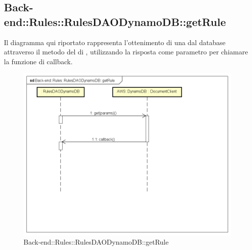 \subsection{Back-end::Rules::RulesDAODynamoDB::getRule}
Il diagramma qui riportato rappresenta l'ottenimento di una  dal database attraverso il metodo  del  di , utilizzando la risposta come parametro per chiamare la funzione di callback.
 \begin{figure}[h] \centering \includegraphics[width=\textwidth,height=\textheight,keepaspectratio]{images/diagrams/back-end/Ufficial_Backend/Back-endRulesRulesDAODynamoDBgetRule.png} 	\caption{Back-end::Rules::RulesDAODynamoDB::getRule}
\end{figure}
\newpage


